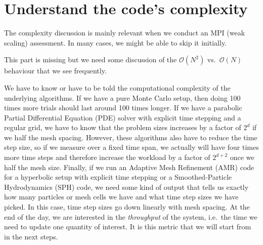 \section{Understand the code's complexity}
\label{section:preparation:complexity}


\begin{readerguide}
 The complexity discussion is mainly relevant when we conduct an MPI (weak scaling) assessment. 
 In many cases, we might be able to skip it initially.
\end{readerguide}


\begin{wip}
 This part is missing but we need some discussion of the $\mathcal{O}(N^2)$ vs.~$\mathcal{O}(N)$ behaviour that we see frequently.
\end{wip}


We have to know or have to be told the computational complexity of the underlying algorithms. 
If we have a pure Monte Carlo setup, then doing 100 times more trials should last around 100 times longer.
If we have a parabolic Partial Differential Equation (PDE) solver with explicit time stepping and a regular grid, we have to know that the problem sizes increases by a factor of $2^d$ if we half the mesh spacing. 
However, these algorithms also have to reduce the time step size, so if we measure over a fixed time span, we actually will have four times more time steps and therefore increase the workload by a factor of $2^{d+2}$ once we half the mesh size.
Finally, if we run an Adaptive Mesh Refinement (AMR) code for a hyperbolic setup with explicit time stepping or a Smoothed-Particle Hydrodynamics (SPH) code, we need some kind of output that tells us exactly how many particles or mesh cells we have and what time step sizes we have picked. In this case, time step sizes go down linearly with mesh spacing.
At the end of the day, we are interested in the \emph{throughput} of the system, i.e.~the time we need to update one quantity of interest.
It is this metric that we will start from in the next steps. 
